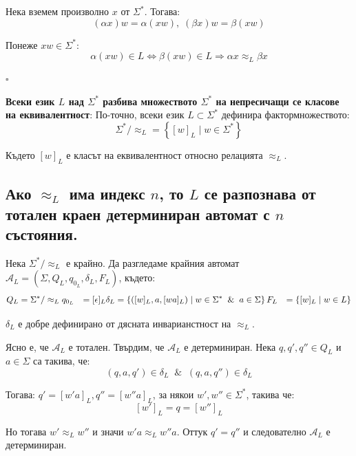 \documentclass{article}
\renewcommand{\\}{\newline}
\newcommand{\amp}{\;\&\;}
\newcommand{\sep}{\;|\;}
\newcommand{\proven}{\hfill $\square$}
\begin{document}
      Нека вземем произволно \(x\) от \(\Sigma^{*}\). Тогава: \[
        (\alpha x) w = \alpha (xw), \; (\beta x)w = \beta(xw)
      \]    

      Понеже \(xw \in \Sigma^{*}\): \[
        \alpha(xw) \in L \iff \beta(xw) \in L \Rightarrow \alpha x \approx_{L } \beta x
      \]  

    \proven

  \textbf{Всеки език \(L\) над \(\Sigma^{*}\) разбива множеството \(\Sigma^{*}\) на непресичащи се класове на еквивалентност}: По-точно, всеки език \(L \subset \Sigma^{*}\) дефинира фактормножеството: \[
      \Sigma^{*}/\approx_{L} = \left\{[w]_{L} \sep w \in \Sigma^{*}\right\}
    \] 

    Където \([w]_{L}\) е класът на еквивалентност относно релацията \(\approx_{L}\).  

  \subsection{Ако \(\approx_{L}\) има индекс \(n\), то \(L\) се разпознава от тотален краен детерминиран автомат с \(n\) състояния.} 
  Нека \(\Sigma^{*}/ \approx_{L}\) е крайно. Да разгледаме крайния автомат \(\mathcal{A}_{L} = (\Sigma, Q_{L}, q_{0_{L}}, \delta_{L}, F_{L})\), където:
    \begin{align*}
      Q_{L} &= \Sigma^{*}/\approx_{L} \\
      q_{0_{L}} &= [\epsilon]_{L} \\
      \delta_{L} &= \left\{([w]_{L}, a, [wa]_{L}) \sep w \in \Sigma^{*} \;\amp\; a \in \Sigma\right\} \\
      F_{L} &= \left\{[w]_{L} \sep w \in L\right\}
    \end{align*}

    \(\delta_{L}\) е добре дефинирано от дясната инварианстност на \(\approx_{L}\).

    Ясно е, че \(\mathcal{A}_{L}\) е тотален. Твърдим, че \(\mathcal{A}_{L}\) е детерминиран. Нека \(q, q', q'' \in Q_{L}\) и \(a \in \Sigma\) са такива, че:\[
      (q, a, q') \in \delta_{L} \;\amp\; (q, a, q'') \in \delta_{L}
    \] 

    Тогава: \(q' = [w'a]_{L}, q'' = [w''a]_{L}\), за някои \(w', w'' \in \Sigma^{*}\), такива че: \[
      [w']_{L} = q = [w'']_{L}
    \]     

    Но тогава \(w' \approx_{L} w''\) и значи \(w'a \approx_{L} w''a\). Оттук \(q' = q''\) и следователно \(\mathcal{A}_{L}\) е детерминиран.    
\end{document}
